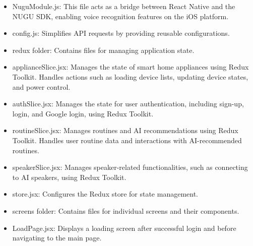 \documentclass[conference]{IEEEtran}
\begin{document}
\begin{enumerate}[label=\arabic*]
\begin{itemize}[label=-]
        \item NuguModule.js: This file acts as a bridge between React Native and the NUGU SDK, enabling voice recognition features on the iOS platform.
        \vspace{0.7em}
        
        \item config.js: Simplifies API requests by providing reusable configurations.
        \vspace{0.7em}
        
        \item redux folder: Contains files for managing application state.
        \vspace{0.7em}
        
        \item applianceSlice.jsx: Manages the state of smart home appliances using Redux Toolkit. Handles actions such as loading device lists, updating device states, and power control.
        \vspace{0.7em}
        
        \item authSlice.jsx: Manages the state for user authentication, including sign-up, login, and Google login, using Redux Toolkit.
        \vspace{0.7em}
        
        \item routineSlice.jsx: Manages routines and AI recommendations using Redux Toolkit. Handles user routine data and interactions with AI-recommended routines.
        \vspace{0.7em}
        
        \item speakerSlice.jsx: Manages speaker-related functionalities, such as connecting to AI speakers, using Redux Toolkit.
        \vspace{0.7em}
        
        \item store.jsx: Configures the Redux store for state management.
        \vspace{0.7em}
        
        \item screens folder: Contains files for individual screens and their components.
        \vspace{0.7em}
        
        \item LoadPage.jsx: Displays a loading screen after successful login and before navigating to the main page.
        \vspace{0.7em}
        

\end{itemize}
\end{enumerate}
\end{document}
